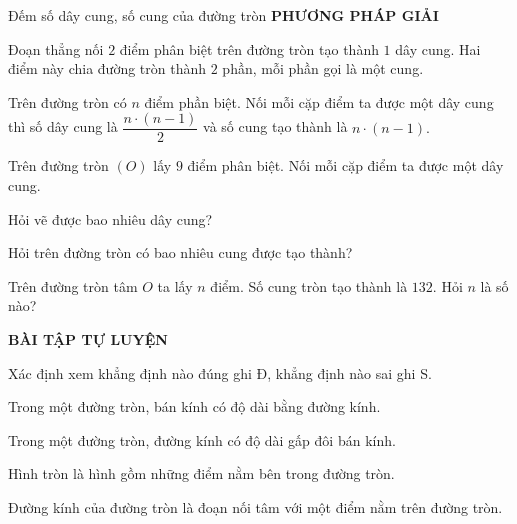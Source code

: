 \begin{dang}{Đếm số dây cung, số cung của đường tròn}
	\textbf{PHƯƠNG PHÁP GIẢI}\medskip
	
	Đoạn thẳng nối $2$ điểm phân biệt trên đường tròn tạo thành $1$ dây cung. Hai điểm này chia đường tròn thành $2$ phần, mỗi phần gọi là một cung.\medskip
	
	Trên đường tròn có $n$ điểm phần biệt. Nối mỗi cặp điểm ta được một dây cung thì số dây cung là $\dfrac{n\cdot (n-1)}{2}$ và số cung tạo thành là $n\cdot (n-1).$
\end{dang}
\setcounter{vd}{0}
\begin{vd}%
	Trên đường tròn $(O)$ lấy $9$ điểm phân biệt. Nối mỗi cặp điểm ta được một dây cung.
	\begin{listEX}[]
		\item Hỏi vẽ được bao nhiêu dây cung?
		\item Hỏi trên đường tròn có bao nhiêu cung được tạo thành?
	\end{listEX}
\end{vd}
\begin{vd}%
	Trên đường tròn tâm $O$ ta lấy $n$ điểm. Số cung tròn tạo thành là $132$. Hỏi $n$ là số nào?
\end{vd}
\begin{center}
	\textbf{BÀI TẬP TỰ LUYỆN}
\end{center}
\begin{bt}%
	Xác định xem khẳng định nào đúng ghi Đ, khẳng định nào sai ghi S.
	\def\listEXenumi{(\Alph{enumi})}
	\begin{listEX}
		\item {} Trong một đường tròn, bán kính có độ dài bằng đường kính.
		\item {} Trong một đường tròn, đường kính có độ dài gấp đôi bán kính.
		\item {} Hình tròn là hình gồm những điểm nằm bên trong đường tròn.
		\item {} Đường kính của đường tròn là đoạn nối tâm với một điểm nằm trên đường tròn.
	\end{listEX}
\end{bt}

